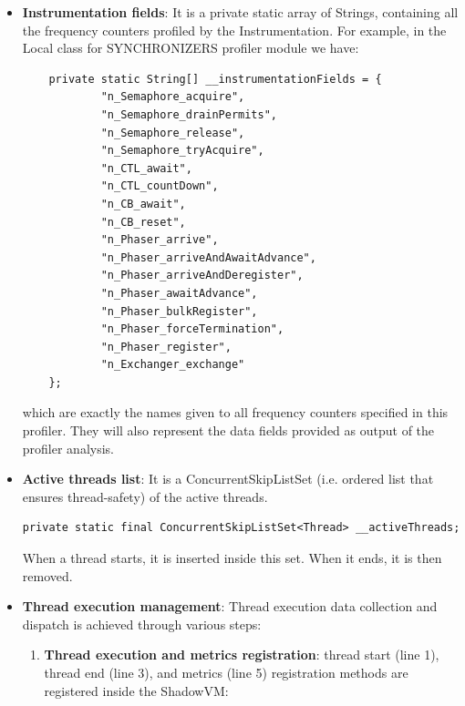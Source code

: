 \documentclass[]{usiinfthesis}
\begin{document}
\begin{itemize}
    \item \textbf{Instrumentation fields}: It is a private static array of Strings, containing all the frequency counters profiled by the Instrumentation. For example, in the Local class for SYNCHRONIZERS profiler module we have:
    
\vspace*{0.25cm}
    \begin{verbatim}
    private static String[] __instrumentationFields = {
            "n_Semaphore_acquire",
            "n_Semaphore_drainPermits",
            "n_Semaphore_release",
            "n_Semaphore_tryAcquire",
            "n_CTL_await",
            "n_CTL_countDown",
            "n_CB_await",
            "n_CB_reset",
            "n_Phaser_arrive",
            "n_Phaser_arriveAndAwaitAdvance",
            "n_Phaser_arriveAndDeregister",
            "n_Phaser_awaitAdvance",
            "n_Phaser_bulkRegister",
            "n_Phaser_forceTermination",
            "n_Phaser_register",
            "n_Exchanger_exchange"
    };
    \end{verbatim}
    \vspace*{0.25cm}
    which are exactly the names given to all frequency counters specified in this profiler. They will also represent the data fields provided as output of the profiler analysis.
    \item \textbf{Active threads list}: It is a ConcurrentSkipListSet (i.e. ordered list that ensures thread-safety) of the active threads.
    \vspace*{0.25cm}
    \begin{verbatim}
private static final ConcurrentSkipListSet<Thread> __activeThreads;
        \end{verbatim}
        \vspace*{0.25cm}
    When a thread starts, it is inserted inside this set. When it ends, it is then removed.
    
    \item \textbf{Thread execution management}: Thread execution data collection and dispatch is achieved through various steps:
    \begin{enumerate}
         \item \textbf{Thread execution and metrics registration}: thread start (line 1), thread end (line 3), and metrics (line 5) registration methods are registered inside the ShadowVM:
         

\end{enumerate}
\end{itemize}
\end{document}
